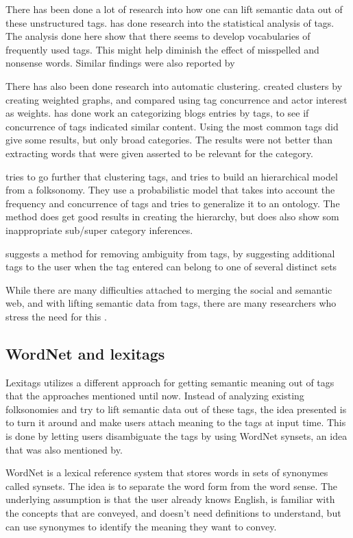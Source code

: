 There has been done a lot of research into how one can lift semantic data out of these unstructured tags.
\citet{Golder2005} has done research into the statistical analysis of tags. 
The analysis done here show that there seems to develop vocabularies of frequently used tags. 
This might help diminish the effect of misspelled and nonsense words. Similar findings were also reported by \citep{Shirky2007}

There has also been done research into automatic clustering. 
\citet{Mika2005} created clusters by creating weighted graphs, and compared using tag concurrence and actor interest as weights.  
\citet{Brooks2006} has done work an categorizing blogs entries by tags, to see if concurrence of tags indicated similar content. 
Using the most common tags did give some results, but only broad categories. The results were not better than extracting words that were given asserted to be relevant for the category.

\citep{Tang2009} tries to go further that clustering tags, and tries to build an hierarchical model from a folksonomy. 
They use a probabilistic model that takes into account the frequency and concurrence of tags and tries to generalize it to an ontology. 
The method does get good results in creating the hierarchy, but does also show som inappropriate sub/super category inferences.

\citet{Weinberger2008} suggests a method for removing ambiguity from tags,
 by suggesting additional tags to the user when the tag entered can belong to one of several distinct sets 

While there are many difficulties attached to merging the social and semantic web, and with lifting semantic data from tags, there are many researchers who stress the need for this \citep{Passant2007,Mika2005, Gruber2007}.

\subsection{WordNet and lexitags}
Lexitags \citep{Veres2011} utilizes a different approach for getting semantic meaning out of tags that the approaches mentioned until now. 
Instead of analyzing existing folksonomies and try to lift semantic data out of these tags, the idea presented is to turn it around and make users attach meaning to the tags at input time.
This is done by letting users disambiguate the tags by using WordNet synsets, an idea that was also mentioned by.

WordNet is a lexical reference system that stores words in sets of synonymes called synsets. The idea is to separate the word form from the word sense. 
The underlying assumption is that the user already knows English, is familiar with the concepts that are conveyed, 
and doesn't need definitions to understand, but can use synonymes to identify the meaning they want to convey\citep{Miller1990}.

